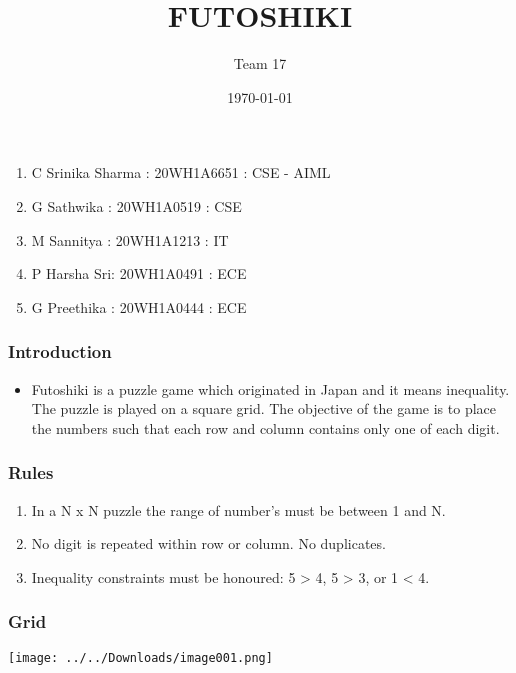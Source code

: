 \documentclass[14pt]{beamer}
\title{FUTOSHIKI}
\subtitle{Team 17}
\date{\today}
\begin{document}
  
  \begin{frame}
        \titlepage
    \end{frame}
  \begin{frame}
      \begin{enumerate}
	     \item C Srinika Sharma : 20WH1A6651 : CSE - AIML
		 \item G Sathwika : 20WH1A0519 : CSE
		 \item M Sannitya : 20WH1A1213 : IT
		 \item P Harsha Sri: 20WH1A0491 : ECE
         \item G Preethika : 20WH1A0444 : ECE
	  \end{enumerate}
  \end{frame}
  
  \begin{frame}
	\frametitle{Introduction}
        
	\begin{itemize}
	    \item Futoshiki is a puzzle game which originated in Japan and it means inequality. The puzzle is played on a square grid. The objective of the game is to place the numbers such that each row and column contains only one of each digit.
	\end{itemize}
	
  \end{frame}
   \begin{frame}
	\frametitle{Rules}

	\begin{enumerate}
	    \item In a N x N puzzle the range of number's must be between 1 and N.  
	    \item No digit is repeated within row or column. No duplicates. 
	    \item Inequality constraints must be honoured: 5 > 4, 5 > 3, or 1 < 4.
	\end{enumerate}
  \end{frame}
 \begin{frame}
	\frametitle{Grid}
        
	\texttt{[image: ../../Downloads/image001.png]}
	
  \end{frame}
   
 
\end{document}
